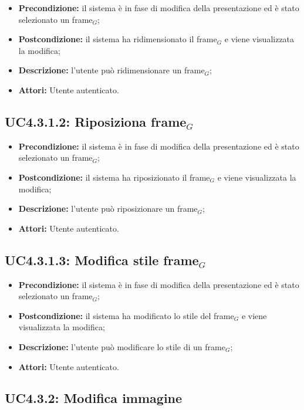 \begin{itemize}
	\item \textbf{Precondizione:} il sistema è in fase di modifica della presentazione ed è stato selezionato un frame$_G$;
	\item \textbf{Postcondizione:} il sistema ha ridimensionato il frame$_G$ e viene visualizzata la modifica;
	\item \textbf{Descrizione:} l'utente può ridimensionare un frame$_G$;
	\item \textbf{Attori:} Utente autenticato.
\end{itemize}
\subsection{ UC4.3.1.2: Riposiziona frame$_G$}

\begin{itemize}
	\item \textbf{Precondizione:} il sistema è in fase di modifica della presentazione ed è stato selezionato un frame$_G$;
	\item \textbf{Postcondizione:} il sistema ha riposizionato il frame$_G$ e viene visualizzata la modifica;
	\item \textbf{Descrizione:} l'utente può riposizionare un frame$_G$;
	\item \textbf{Attori:} Utente autenticato.
\end{itemize}
\subsection{ UC4.3.1.3: Modifica stile frame$_G$}

\begin{itemize}
	\item \textbf{Precondizione:} il sistema è in fase di modifica della presentazione ed è stato selezionato un frame$_G$;
	\item \textbf{Postcondizione:} il sistema ha modificato lo stile del frame$_G$ e viene visualizzata la modifica;
	\item \textbf{Descrizione:} l'utente può modificare lo stile di un frame$_G$;
	\item \textbf{Attori:} Utente autenticato.
\end{itemize}
\subsection{ UC4.3.2: Modifica immagine}


